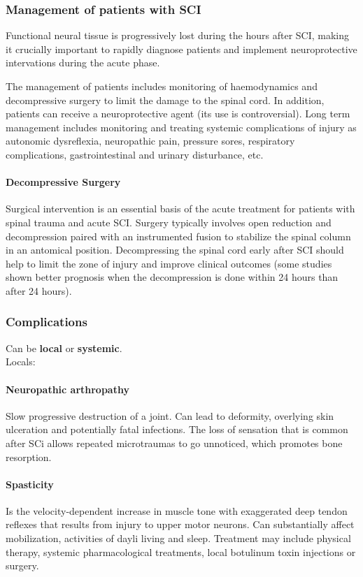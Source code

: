 \documentclass[12pt,article,oneside,a4paper]{memoir}
\begin{document}
\subsubsection{Management of patients with SCI}
Functional neural tissue is progressively lost during the hours after SCI, making it crucially important to rapidly diagnose patients and implement neuroprotective intervations during the acute phase.

The management of patients includes monitoring of haemodynamics and decompressive surgery to limit the damage to the spinal cord. In addition, patients can receive a neuroprotective agent (its use is controversial). Long term management includes monitoring and treating systemic complications of injury as autonomic dysreflexia, neuropathic pain, pressure sores, respiratory complications, gastrointestinal and urinary disturbance, etc.

\paragraph{Decompressive Surgery} Surgical intervention is an essential basis of the acute treatment for patients with spinal trauma and acute SCI. Surgery typically involves open reduction and decompression paired with an instrumented fusion to stabilize the spinal column in an antomical position. Decompressing the spinal cord early after SCI should help to limit the zone of injury and improve clinical outcomes (some studies shown better prognosis when the decompression is done within 24 hours than after 24 hours).


\subsubsection{Complications}
Can be \textbf{local} or \textbf{systemic}. \\
Locals:
\paragraph{Neuropathic arthropathy} Slow progressive destruction of a joint. Can lead to deformity, overlying skin ulceration and potentially fatal infections. The loss of sensation that is common after SCi allows repeated microtraumas to go unnoticed, which promotes bone resorption.

\paragraph{Spasticity} Is the velocity-dependent increase in muscle tone with exaggerated deep tendon reflexes that results from injury to upper motor neurons. Can substantially affect mobilization, activities of dayli living and sleep. Treatment may include physical therapy, systemic pharmacological treatments, local botulinum toxin injections or surgery. \\
\end{document}
